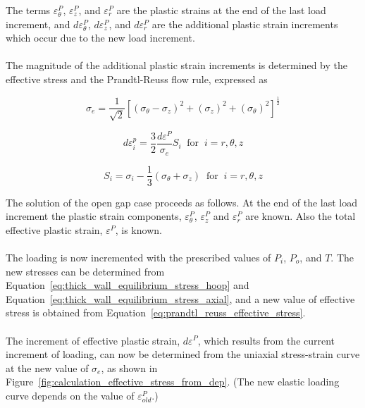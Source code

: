 The terms $\varepsilon_{\theta}^P$, $\varepsilon_{z}^P$, and $\varepsilon_{r}^P$ are the plastic
strains at the end of the last load increment, and $d\varepsilon_{\theta}^P$, $d\varepsilon_{z}^P$,
and $d\varepsilon_{r}^P$ are the additional plastic strain increments which occur due to the new
load increment.
\\
\\
The magnitude of the additional plastic strain increments is determined by the effective stress and
the Prandtl-Reuss flow rule, expressed as

\begin{equation}
    \label{eq:prandtl_reuss_effective_stress}
    \sigma_{e} = \frac{1}{\sqrt{2}} \left[ \left( \sigma_{\theta} - \sigma_{z} \right)^{2}   + \left(\sigma_{z} \right)^{2} +  \left(\sigma_{\theta} \right)^{2} \right]^{\frac{1}{2}}
\end{equation}

\begin{equation}
    \label{eq:prandtl_reuss_dep_i}
    d{\varepsilon}^{p}_{i} = \frac{3}{2} \frac{d\varepsilon^{P}}{\sigma_{e}}S_{i}\;\;\text{for}\;\; i = r, \theta, z
\end{equation}

\begin{equation}
    \label{eq:prandtl_reuss_S_i}
    S_{i} = \sigma_{i} - \frac{1}{3} \left(\sigma_{\theta} + \sigma_{z}\right)\;\;\text{for}\;\; i = r, \theta, z 
\end{equation}

The solution of the open gap case proceeds as follows. At the end of the last load increment the
plastic strain components, $\varepsilon_{\theta}^P$, $\varepsilon_{z}^P$ and $\varepsilon_{r}^P$ are
known.  Also the total effective plastic strain, $\varepsilon^{P}$, is
known.
\\
\\
The loading is now incremented with the prescribed values of $P_{i}$, $P_{o}$, and $T$. The new
stresses can be determined from Equation~\ref{eq:thick_wall_equilibrium_stress_hoop} and
Equation~\ref{eq:thick_wall_equilibrium_stress_axial}, and a new value of effective stress is
obtained from Equation~\ref{eq:prandtl_reuss_effective_stress}.
\\
\\
The increment of effective plastic strain, $d\varepsilon^{P}$, which results from the current
increment of loading, can now be determined from the uniaxial stress-strain curve at the new value
of $\sigma_{e}$, as shown in Figure~\ref{fig:calculation_effective_stress_from_dep}. (The new
elastic loading curve depends on the value of $\varepsilon^{P}_{old}$.)

